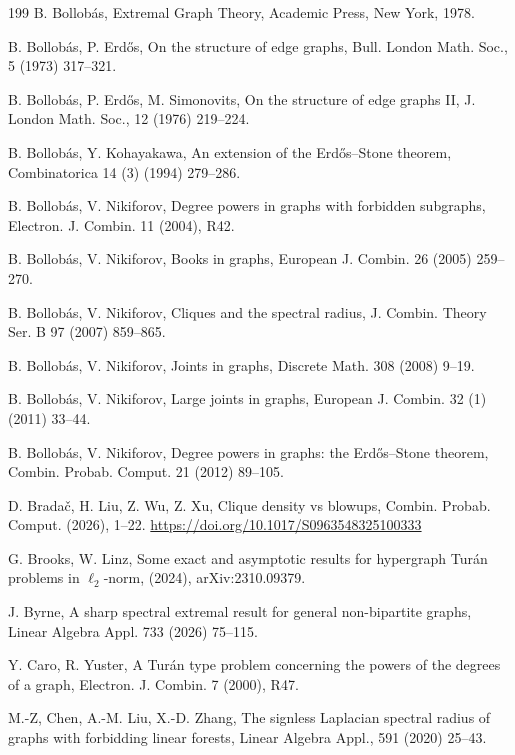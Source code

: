 \documentclass[11pt,a4paper]{article}
\theoremstyle{plain}
\theoremstyle{definition}
\begin{document}
\begin{thebibliography}{199}
B. Bollob\'as, Extremal Graph Theory, 
Academic Press, New York, 1978.

B. Bollob\'as, P.  Erd\H{o}s, 
On the structure of edge graphs,  
{Bull. London Math. Soc.}, 5 (1973) 317--321. 


B. Bollob\'{a}s, P. Erd\H{o}s, M. Simonovits, 
On the structure of edge graphs II,
J. London Math. Soc., 12 (1976) 219--224.


B. Bollob\'{a}s,  Y. Kohayakawa, 
An extension of the Erd\H{o}s--Stone theorem, 
Combinatorica 14 (3) (1994) 279--286. 

B. Bollob\'{a}s, V. Nikiforov,
Degree powers in graphs with forbidden subgraphs,
 Electron.  J. Combin. 11 (2004), R42.

 
B. Bollob\'{a}s, V. Nikiforov, 
Books in graphs, 
European J. Combin. 26 (2005) 259--270.  


B. Bollob\'{a}s, V. Nikiforov, 
Cliques and the spectral radius, 
 J. Combin. Theory Ser.  B 97 (2007) 859--865. 

B. Bollob\'{a}s, V. Nikiforov, 
Joints in graphs, 
Discrete Math. 308 (2008) 9--19. 

B. Bollob\'{a}s, V. Nikiforov, 
Large joints in graphs,  
European J. Combin. 32 (1) (2011) 33--44.  

B. Bollob\'{a}s, V. Nikiforov,
Degree powers in graphs: the Erd\H{o}s--Stone theorem,
Combin. Probab. Comput. 21 (2012) 89--105.

D. Brada\v{c}, H. Liu, Z. Wu, Z. Xu,  Clique density vs blowups, Combin. Probab. Comput. (2026), 1–22. \url{ https://doi.org/10.1017/S0963548325100333}

G. Brooks, W. Linz, 
Some exact and asymptotic results for hypergraph
Tur\'{a}n problems in $\ell_2$-norm, 
(2024), arXiv:2310.09379. 

 
J. Byrne, A sharp spectral extremal result for general non-bipartite graphs, 
Linear Algebra Appl. 733 (2026) 75–115.


Y. Caro, R. Yuster, A Tur\'{a}n type problem concerning the powers of the degrees of a
graph, Electron. J. Combin. 7 (2000), R47.

M.-Z, Chen, A.-M. Liu, X.-D. Zhang, 
The signless Laplacian spectral radius of graphs with forbidding linear forests,  
{Linear Algebra Appl.}, 591 (2020) 25--43.


\end{thebibliography}
\end{document}

